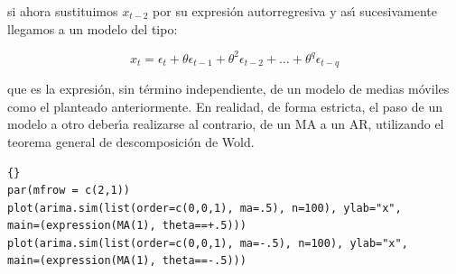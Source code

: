 si ahora sustituimos $x_{t-2}$ por su expresi\'on autorregresiva y as\'{\i} sucesivamente llegamos a un modelo del tipo:

\begin{equation}
x_t = \epsilon_t + \theta \epsilon_{t-1} +  \theta^2 \epsilon_{t-2} + \dots{} +  \theta^q \epsilon_{t-q} 
\end{equation}

que es la expresi\'on, sin t\'ermino independiente, de un modelo de medias m\'oviles como el planteado anteriormente. En realidad, de forma estricta, el paso de un modelo a otro deber\'{\i}a realizarse al contrario, de un MA a un AR, utilizando el teorema general de descomposici\'on de Wold.



\begin{lstlisting}[title={‘Código R: ejemplo Simulaci\'on modelo MA(1) ’},basicstyle=\ttfamily]{}
par(mfrow = c(2,1))
plot(arima.sim(list(order=c(0,0,1), ma=.5), n=100), ylab="x",
main=(expression(MA(1), theta==+.5)))
plot(arima.sim(list(order=c(0,0,1), ma=-.5), n=100), ylab="x",
main=(expression(MA(1), theta==-.5)))
\end{lstlisting}

